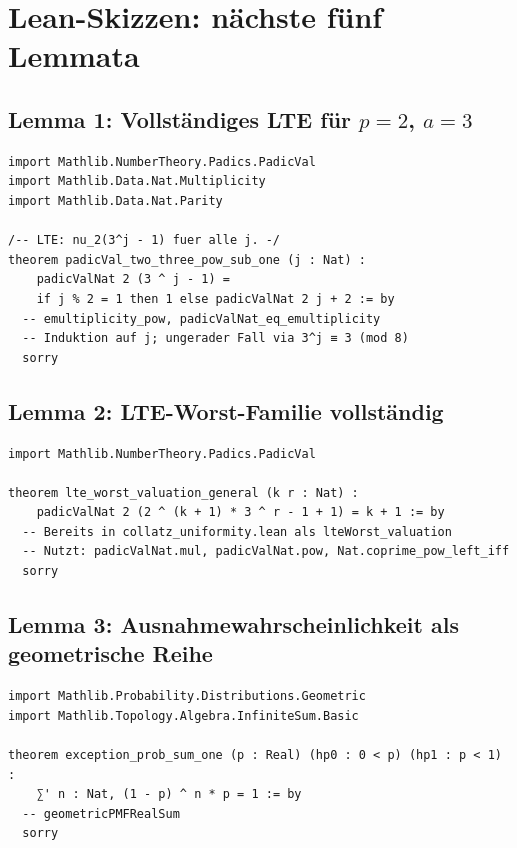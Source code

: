 \documentclass[12pt,a4paper]{article}
\begin{document}
\section{Lean-Skizzen: nächste fünf Lemmata}
\label{sec:skizzen}

\subsection{Lemma 1: Vollständiges LTE für $p=2$, $a=3$}

\begin{lstlisting}[language=Lean4]
import Mathlib.NumberTheory.Padics.PadicVal
import Mathlib.Data.Nat.Multiplicity
import Mathlib.Data.Nat.Parity

/-- LTE: nu_2(3^j - 1) fuer alle j. -/
theorem padicVal_two_three_pow_sub_one (j : Nat) :
    padicValNat 2 (3 ^ j - 1) =
    if j % 2 = 1 then 1 else padicValNat 2 j + 2 := by
  -- emultiplicity_pow, padicValNat_eq_emultiplicity
  -- Induktion auf j; ungerader Fall via 3^j ≡ 3 (mod 8)
  sorry
\end{lstlisting}

\subsection{Lemma 2: LTE-Worst-Familie vollständig}

\begin{lstlisting}[language=Lean4]
import Mathlib.NumberTheory.Padics.PadicVal

theorem lte_worst_valuation_general (k r : Nat) :
    padicValNat 2 (2 ^ (k + 1) * 3 ^ r - 1 + 1) = k + 1 := by
  -- Bereits in collatz_uniformity.lean als lteWorst_valuation
  -- Nutzt: padicValNat.mul, padicValNat.pow, Nat.coprime_pow_left_iff
  sorry
\end{lstlisting}

\subsection{Lemma 3: Ausnahmewahrscheinlichkeit als geometrische Reihe}

\begin{lstlisting}[language=Lean4]
import Mathlib.Probability.Distributions.Geometric
import Mathlib.Topology.Algebra.InfiniteSum.Basic

theorem exception_prob_sum_one (p : Real) (hp0 : 0 < p) (hp1 : p < 1) :
    ∑' n : Nat, (1 - p) ^ n * p = 1 := by
  -- geometricPMFRealSum
  sorry
\end{lstlisting}
\end{document}
